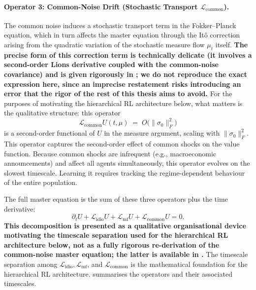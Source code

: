 \paragraph{Operator 3: Common-Noise Drift (Stochastic Transport $\mathcal{L}_{\mathrm{common}}$).}
The common noise induces a stochastic transport term in the Fokker--Planck equation,
which in turn affects the master equation through the It\^o correction arising from
the quadratic variation of the stochastic measure flow $\mu_t$ itself. \textbf{The
precise form of this correction term is technically delicate (it involves a
second-order Lions derivative coupled with the common-noise covariance) and is given
rigorously in \citep{cardaliaguetetal2019}; we do not reproduce the exact expression
here, since an imprecise restatement risks introducing an error that the rigor of the
rest of this thesis aims to avoid.} For the purposes of motivating the hierarchical
RL architecture below, what matters is the qualitative structure: this operator
\begin{equation}
    \mathcal{L}_{\mathrm{common}} U(t,\mu) \;=\; O\big(\|\sigma_0\|_F^2\big)
    \label{eq:operator-common}
\end{equation}
is a second-order functional of $U$ in the measure argument, scaling with
$\|\sigma_0\|_F^2$.
This operator captures the second-order effect of common shocks on the value
function. Because common shocks are infrequent (e.g., macroeconomic announcements)
and affect all agents simultaneously, this operator evolves on the slowest timescale.
Learning it requires tracking the regime-dependent behaviour of the entire
population.

The full master equation is the sum of these three operators plus the time
derivative:
\[
    \partial_t U + \mathcal{L}_{\mathrm{idio}} U + \mathcal{L}_{\mathrm{mf}} U +
    \mathcal{L}_{\mathrm{common}} U = 0.
\]
\textbf{This decomposition is presented as a qualitative organisational device
motivating the timescale separation used for the hierarchical RL architecture below,
not as a fully rigorous re-derivation of the common-noise master equation; the latter
is available in \citep{cardaliaguetetal2019}.} The timescale separation among
$\mathcal{L}_{\mathrm{idio}}, \mathcal{L}_{\mathrm{mf}}$,
and $\mathcal{L}_{\mathrm{common}}$ is the mathematical foundation for the hierarchical
RL architecture.  summarises the operators and their
associated timescales.

